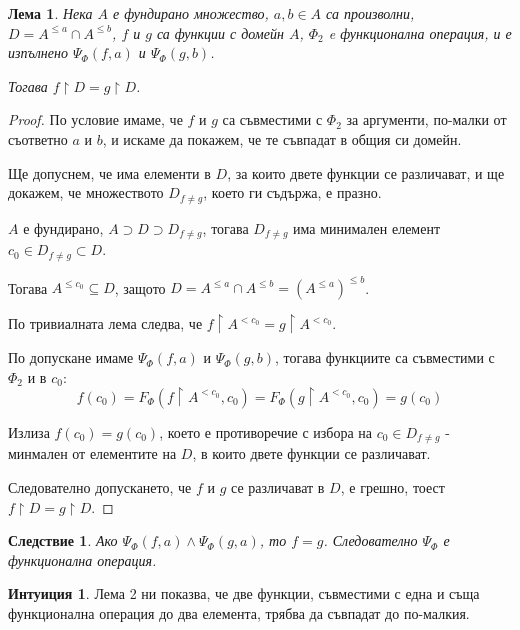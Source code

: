 \documentclass{article}
\newtheorem{lemma}[tlemma]{Лема}
\newtheorem*{corollary}{Следствие}
\theoremstyle{definition}
\newtheorem{intuit}{Интуиция}
\begin{document}
\begin{multicols}{2}
\begin{lemma}
    Нека
    $A$ е фундирано множество,
    ${a,b\!\in\!A}$ са произволни,
    ${D=A^{\le a}\cap A^{\le b}}$,
    $f$ и $g$ са функции с домейн $A$,
    $\Phi_2$ e функционална операция,\linebreak
    и е изпълнено $\Psi_{\Phi}(f, a)$ и $\Psi_{\Phi}(g,b)$.

    Тогава $f \upharpoonright D = g \upharpoonright D$. %
\end{lemma}

\begin{proof}
    По условие имаме, че $f$ и $g$ са съвместими с $\Phi_2$ за аргументи, по-малки от съответно $a$ и $b$, и искаме да покажем, че те съвпадат в общия си домейн.

    Ще допуснем, че има елементи в $D$, за които двете функции се различават,
    и ще докажем, че множеството $D_{f \ne g}$, което ги съдържа, е празно.

    $A$ е фундирано, $A \supset D \supset D_{f \ne g}$, тогава $D_{f \ne g}$ има минимален елемент $c_0 \in D_{f \ne g} \subset D$.

    Тогава $A^{\le{c_0}} \subseteq D$, защото ${D = A^{\le a}\cap A^{\le b} = (A^{\le a})^{\le b}}$.

    По тривиалната лема следва, че ${f \upharpoonright A^{<c_0} = g \upharpoonright A^{<c_0}}$.

    По допускане имаме $\Psi_\Phi(f,a)$ и $\Psi_\Phi(g,b)$, тогава функциите са съвместими с $\Phi_2$ и в $c_0$:
    \[ f(c_0) = F_\Phi(f\upharpoonright A^{<c_0}, c_0 ) =F_\Phi(g\upharpoonright A^{<c_0}, c_0) = g(c_0) \]

    Излиза $f(c_0) = g(c_0)$, което е противоречие с избора на $c_0 \in D_{f \ne g}$ - минмален от елементите на $D$, в които двете функции се различават.

    Следователно допускането, че $f$ и $g$ се различават в $D$, е грешно, тоест $f \upharpoonright D = g \upharpoonright D$.
\end{proof}

\begin{corollary}
    Ако $\Psi_\Phi(f,a) \land \Psi_\Phi(g,a)$, то ${f=g}$.
Следователно $\Psi_\Phi$ е функционална операция.
\end{corollary}

{\small
    \begin{intuit}
        Лема 2 ни показва, че две функции, съвместими с една и съща функционална операция до два елемента, трябва да съвпадат до по-малкия. 


\end{intuit}}
\end{multicols}
\end{document}
